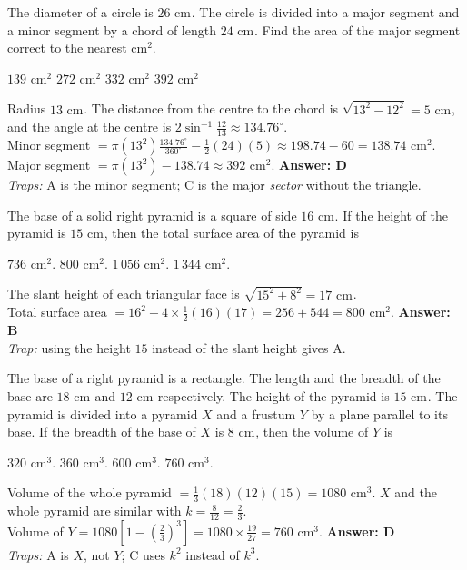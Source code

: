 \documentclass[11pt,addpoints]{exam}
\newcommand{\cm}[1]{\text{ cm}^{#1}}
\begin{document}
\begin{questions}
The diameter of a circle is $26\cm{}$. The circle is divided into a major segment and a minor segment by a chord of length $24\cm{}$. Find the area of the major segment correct to the nearest $\text{cm}^2$.
\begin{oneparchoices}
  \choice $139\cm2$ \choice $272\cm2$ \choice $332\cm2$ \CorrectChoice $392\cm2$
\end{oneparchoices}
\begin{solution}
Radius $13\cm{}$. The distance from the centre to the chord is $\sqrt{13^2 - 12^2} = 5\cm{}$, and the angle at the centre is $2\sin^{-1}\frac{12}{13} \approx 134.76^\circ$.\\
Minor segment $= \pi(13^2)\frac{134.76^\circ}{360^\circ} - \frac12(24)(5) \approx 198.74 - 60 = 138.74\cm2$.\\
Major segment $= \pi(13^2) - 138.74 \approx 392\cm2$. \quad \textbf{Answer: D} \\
\emph{Traps:} A is the minor segment; C is the major \emph{sector} without the triangle.
\end{solution}

The base of a solid right pyramid is a square of side $16\cm{}$. If the height of the pyramid is $15\cm{}$, then the total surface area of the pyramid is
\begin{oneparchoices}
  \choice $736\cm2$. \CorrectChoice $800\cm2$. \choice $1\,056\cm2$. \choice $1\,344\cm2$.
\end{oneparchoices}
\begin{solution}
The slant height of each triangular face is $\sqrt{15^2 + 8^2} = 17\cm{}$.\\
Total surface area $= 16^2 + 4\times\frac12(16)(17) = 256 + 544 = 800\cm2$. \quad \textbf{Answer: B} \\
\emph{Trap:} using the height $15$ instead of the slant height gives A.
\end{solution}

The base of a right pyramid is a rectangle. The length and the breadth of the base are $18\cm{}$ and $12\cm{}$ respectively. The height of the pyramid is $15\cm{}$. The pyramid is divided into a pyramid $X$ and a frustum $Y$ by a plane parallel to its base. If the breadth of the base of $X$ is $8\cm{}$, then the volume of $Y$ is
\begin{oneparchoices}
  \choice $320\cm3$. \choice $360\cm3$. \choice $600\cm3$. \CorrectChoice $760\cm3$.
\end{oneparchoices}
\begin{solution}
Volume of the whole pyramid $= \frac13(18)(12)(15) = 1080\cm3$. $X$ and the whole pyramid are similar with $k = \frac{8}{12} = \frac23$.\\
Volume of $Y = 1080\left[1 - \left(\frac23\right)^3\right] = 1080 \times \frac{19}{27} = 760\cm3$. \quad \textbf{Answer: D} \\
\emph{Traps:} A is $X$, not $Y$; C uses $k^2$ instead of $k^3$.
\end{solution}


\end{questions}
\end{document}
